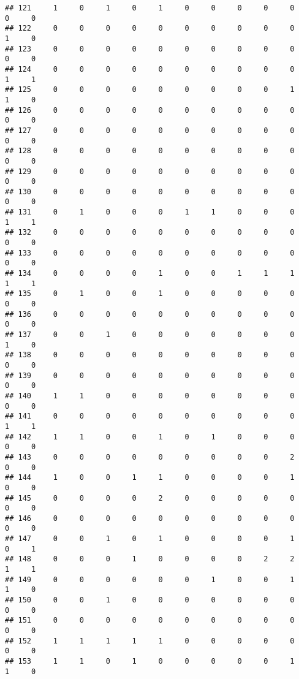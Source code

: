 \documentclass[
]{article}
\begin{document}
\begin{verbatim}
## 121     1     0     1     0     1     0     0     0     0     0     0     0
## 122     0     0     0     0     0     0     0     0     0     0     1     0
## 123     0     0     0     0     0     0     0     0     0     0     0     0
## 124     0     0     0     0     0     0     0     0     0     0     1     1
## 125     0     0     0     0     0     0     0     0     0     1     1     0
## 126     0     0     0     0     0     0     0     0     0     0     0     0
## 127     0     0     0     0     0     0     0     0     0     0     0     0
## 128     0     0     0     0     0     0     0     0     0     0     0     0
## 129     0     0     0     0     0     0     0     0     0     0     0     0
## 130     0     0     0     0     0     0     0     0     0     0     0     0
## 131     0     1     0     0     0     1     1     0     0     0     1     1
## 132     0     0     0     0     0     0     0     0     0     0     0     0
## 133     0     0     0     0     0     0     0     0     0     0     0     0
## 134     0     0     0     0     1     0     0     1     1     1     1     1
## 135     0     1     0     0     1     0     0     0     0     0     0     0
## 136     0     0     0     0     0     0     0     0     0     0     0     0
## 137     0     0     1     0     0     0     0     0     0     0     1     0
## 138     0     0     0     0     0     0     0     0     0     0     0     0
## 139     0     0     0     0     0     0     0     0     0     0     0     0
## 140     1     1     0     0     0     0     0     0     0     0     0     0
## 141     0     0     0     0     0     0     0     0     0     0     1     1
## 142     1     1     0     0     1     0     1     0     0     0     0     0
## 143     0     0     0     0     0     0     0     0     0     2     0     0
## 144     1     0     0     1     1     0     0     0     0     1     0     0
## 145     0     0     0     0     2     0     0     0     0     0     0     0
## 146     0     0     0     0     0     0     0     0     0     0     0     0
## 147     0     0     1     0     1     0     0     0     0     1     0     1
## 148     0     0     0     1     0     0     0     0     2     2     1     1
## 149     0     0     0     0     0     0     1     0     0     1     1     0
## 150     0     0     1     0     0     0     0     0     0     0     0     0
## 151     0     0     0     0     0     0     0     0     0     0     0     0
## 152     1     1     1     1     1     0     0     0     0     0     0     0
## 153     1     1     0     1     0     0     0     0     0     1     1     0

\end{verbatim}
\end{document}
